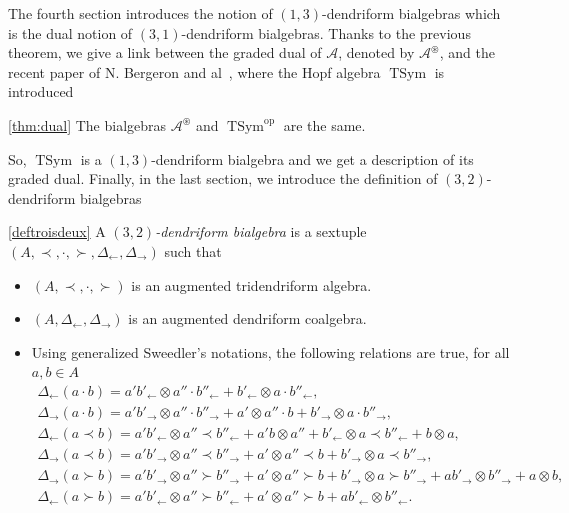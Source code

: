 \documentclass[10pt,a4paper]{amsart}
\makeatletter
\numberwithin{equation}{section}
\theoremstyle{definition}
\theoremstyle{plain}
\newcommand{\mathcenter}{\@fleqnfalse}
\DeclareMathOperator{\op}{op}
\DeclareMathOperator{\TSym}{TSym}
\makeatother
\begin{document}
 The fourth section introduces the notion of $(1,3)$-dendriform bialgebras which is the dual notion of $(3,1)$-dendriform bialgebras. Thanks to the previous theorem, we give a link between the graded dual of $\mathcal{A}$, denoted by $\mathcal{A}^{\circledast}$, and the recent paper of N. Bergeron and al~\cite{Eclair}, where the Hopf algebra $\TSym$ is introduced
\begin{customthm}{\ref{thm:dual}}
	The bialgebras $\mathcal{A}^{\circledast}$ and $\TSym^{\op}$ are the same.
\end{customthm}
So, $\TSym$ is a $(1,3)$-dendriform bialgebra and we get a description of its graded dual.
Finally, in the last section, we introduce the definition of $(3,2)$-dendriform bialgebras
 \begin{customdefi}{\ref{deftroisdeux}}\samepage
	A \emph{$(3,2)$-dendriform bialgebra} is a sextuple $(A,\prec,\cdot,\succ,\Delta_{\leftarrow},\Delta_{\rightarrow})$ such that
	\begin{itemize}\itemsep=0pt
		\item $(A,\prec,\cdot,\succ)$ is an augmented tridendriform algebra.
		\item $(A,\Delta_{\leftarrow},\Delta_{\rightarrow})$ is an augmented dendriform coalgebra.
		\item Using generalized Sweedler's notations, the following relations are true, for all $a,b\in A$
		\begin{gather*}
			\Delta_{\leftarrow}(a\cdot b) =a'b'_{\leftarrow}\otimes a''\cdot b''_{\leftarrow}+b'_{\leftarrow}\otimes a\cdot b''_{\leftarrow},\\
			\Delta_{\rightarrow}(a\cdot b) =a'b'_{\rightarrow}\otimes a''\cdot b''_{\rightarrow}+a'\otimes a''\cdot b+b'_{\rightarrow}\otimes a\cdot b''_{\rightarrow}, \\
			\Delta_{\leftarrow}(a\prec b) =a'b'_{\leftarrow}\otimes a''\prec b''_{\leftarrow}+a'b\otimes a'' +b'_{\leftarrow}\otimes a\prec b''_{\leftarrow}+b\otimes a,\\
			\Delta_{\rightarrow}(a\prec b) =a'b'_{\rightarrow}\otimes a''\prec b''_{\rightarrow}+a'\otimes a''\prec b +b'_{\rightarrow}\otimes a\prec b''_{\rightarrow},\\
			\Delta_{\rightarrow}(a\succ b) =a'b'_{\rightarrow}\otimes a''\succ b''_{\rightarrow}+a'\otimes a''\succ b +b'_{\rightarrow}\otimes a\succ b''_{\rightarrow}+ab'_{\rightarrow}\otimes b''_{\rightarrow}+a\otimes b, \\
			\Delta_{\leftarrow}(a\succ b) =a'b'_{\leftarrow}\otimes a''\succ b''_{\leftarrow}+a'\otimes a''\succ b +ab'_{\leftarrow}\otimes b''_{\leftarrow}.
		\end{gather*}\mathcenter
	\end{itemize}
\end{customdefi}
\end{document}
